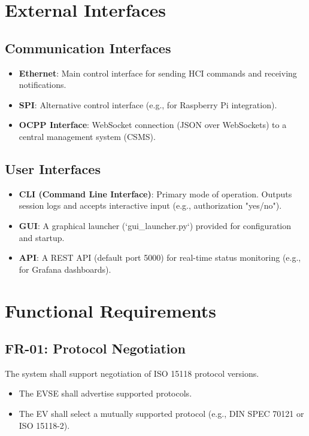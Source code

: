 \documentclass[a4paper,11pt]{report}
\begin{document}
\section{External Interfaces}

\subsection{Communication Interfaces}
\begin{itemize}
    \item \textbf{Ethernet}: Main control interface for sending HCI commands and receiving notifications.
    \item \textbf{SPI}: Alternative control interface (e.g., for Raspberry Pi integration).
    \item \textbf{OCPP Interface}: WebSocket connection (JSON over WebSockets) to a central management system (CSMS).
\end{itemize}

\subsection{User Interfaces}
\begin{itemize}
    \item \textbf{CLI (Command Line Interface)}: Primary mode of operation. Outputs session logs and accepts interactive input (e.g., authorization "yes/no").
    \item \textbf{GUI}: A graphical launcher (`gui\_launcher.py`) provided for configuration and startup.
    \item \textbf{API}: A REST API (default port 5000) for real-time status monitoring (e.g., for Grafana dashboards).
\end{itemize}

\section{Functional Requirements}

\subsection{FR-01: Protocol Negotiation}
The system shall support negotiation of ISO 15118 protocol versions.
\begin{itemize}
    \item The EVSE shall advertise supported protocols.
    \item The EV shall select a mutually supported protocol (e.g., DIN SPEC 70121 or ISO 15118-2).
\end{itemize}
\end{document}
